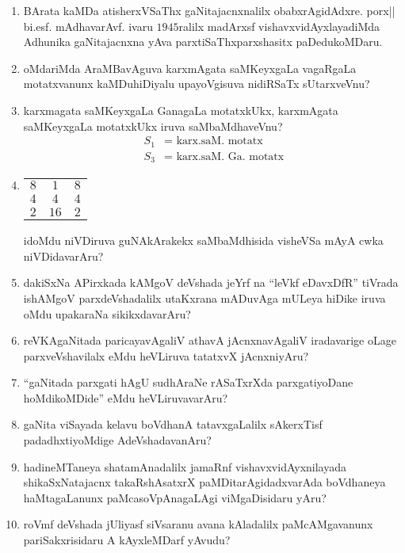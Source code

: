 \begin{enumerate}
\item BArata kaMDa atisherxVSaThx gaNitajacnxnalilx obabxrAgidAdxre. porx|| bi.esf. mAdhavarAvf. ivaru $1945$ralilx madArxsf vishavxvidAyxlayadiMda Adhunika gaNitajacnxna yAva parxtiSaThxparxshasitx paDedukoMDaru.
  
\item oMdariMda AraMBavAguva karxmAgata saMKeyxgaLa vagaRgaLa motatxvanunx kaMDuhiDiyalu upayoVgisuva nidiRSaTx sUtarxveVnu?
  
\item karxmagata saMKeyxgaLa GanagaLa motatxkUkx, karxmAgata saMKeyxgaLa motatxkUkx iruva saMbaMdhaveVnu?
  \begin{align*}
    S_1 & = \text{ karx.saM. motatx}\\
    S_3 & = \text{ karx.saM. Ga. motatx}
  \end{align*}
  
\item
    \begin{tabular}[t]{ccc}
    $8$&$1$&$8$\\
    $4$&$4$&$4$\\
    $2$&$16$&$2$
  \end{tabular}

  idoMdu niVDiruva guNAkArakekx saMbaMdhisida visheVSa mAyA cwka niVDidavarAru?
  
\item dakiSxNa APirxkada kAMgoV deVshada jeYrf na ``leVkf eDavxDfR'' tiVrada ishAMgoV parxdeVshadalilx utaKxrana mADuvAga mULeya hiDike iruva oMdu upakaraNa sikikxdavarAru?

\item reVKAgaNitada paricayavAgaliV athavA jAcnxnavAgaliV iradavarige oLage parxveVshavilalx eMdu heVLiruva tatatxvX jAcnxniyAru?

\item ``gaNitada parxgati hAgU sudhAraNe rASaTxrXda parxgatiyoDane hoMdikoMDide'' eMdu heVLiruvavarAru?

\item gaNita viSayada kelavu boVdhanA tatavxgaLalilx sAkerxTisf padadhxtiyoMdige AdeVshadavanAru?

\item hadineMTaneya shatamAnadalilx jamaRnf vishavxvidAyxnilayada shikaSxNatajacnx takaRshAsatxrX paMDitarAgidadxvarAda boVdhaneya haMtagaLanunx paMcasoVpAnagaLAgi viMgaDisidaru yAru?

\item roVmf deVshada jUliyasf siVsaranu avana kAladalilx paMcAMgavanunx pariSakxrisidaru A kAyxleMDarf yAvudu?


\end{enumerate}
